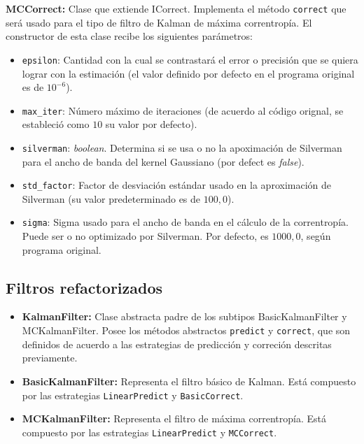 \textbf{MCCorrect:} Clase que extiende ICorrect. Implementa el m\'etodo \texttt{correct} que ser\'a usado para el tipo de filtro de Kalman de m\'axima correntrop\'ia. El constructor de esta clase recibe los siguientes par\'ametros:

\begin{itemize}
\item \texttt{epsilon}: Cantidad con la cual se contrastar\'a el error o precisi\'on que se quiera lograr con la estimaci\'on (el valor definido por defecto en el programa original es de $10^{-6}$).
\item \texttt{max\_iter}: N\'umero m\'aximo de iteraciones (de acuerdo al c\'odigo orignal, se estableci\'o como $10$ su valor por defecto).
\item \texttt{silverman}: \textit{boolean}. Determina si se usa o no la apoximaci\'on de Silverman para el ancho de banda del kernel Gaussiano (por defect es \textit{false}).
\item \texttt{std\_factor}: Factor de desviaci\'on est\'andar usado en la aproximaci\'on de Silverman (su valor predeterminado es de $100,0$).
\item \texttt{sigma}: Sigma usado para el ancho de banda en el c\'alculo de la correntrop\'ia. Puede ser o no optimizado por Silverman. Por defecto, es $1000,0$, seg\'un programa original.
\end{itemize}

\subsection{Filtros refactorizados}

\begin{itemize}
\item \textbf{KalmanFilter:} Clase abstracta padre de los subtipos BasicKalmanFilter y MCKalmanFilter. Posee los m\'etodos abstractos \texttt{predict} y \texttt{correct}, que son definidos de acuerdo a las estrategias de predicci\'on y correci\'on descritas previamente.
\item \textbf{BasicKalmanFilter:} Representa el filtro b\'asico de Kalman. Est\'a compuesto por las estrategias \texttt{LinearPredict} y \texttt{BasicCorrect}.
\item \textbf{MCKalmanFilter:} Representa el filtro de m\'axima correntrop\'ia. Est\'a compuesto por las estrategias \texttt{LinearPredict} y \texttt{MCCorrect}.
\end{itemize}
\bigskip

